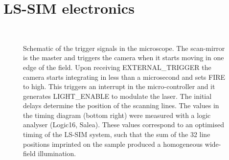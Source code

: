 \chapter{LS-SIM electronics\label{app:LSSIM electronics}}

\begin{figure}[hbt]
	\centering
	\newcommand{\wf}{.8\textwidth}
	\\
	\caption{Schematic of the trigger signals in the microscope. The scan-mirror is the master and triggers the camera when it starts moving in one edge of the field. Upon receiving {\sf EXTERNAL\_TRIGGER} the camera starts integrating in less than a microsecond and sets {\sf FIRE} to high. This triggers an interrupt in the micro-controller and it generates {\sf LIGHT\_ENABLE} to modulate the laser. The initial delays determine the position of the scanning lines.
The values in the timing diagram (bottom right) were measured with a logic analyser (Logic16, Salea). These values correspond to an optimised timing of the LS-SIM system, such that the sum of the 32 line positions imprinted on the sample produced a homogeneous wide-field illumination.} 
\end{figure}

